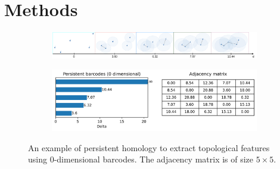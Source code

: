 \vspace{-0.2cm}
\section{Methods}
\label{sec:methods}
\vspace{-0.1cm}

\begin{figure}[H]%
	\centering
	\begin{subfigure}[t]{1\textwidth}
		\centering
		\includegraphics[width=1\textwidth, trim={0cm, 0.0cm, 0.0cm, 0.0cm}]{figures/barcodes_generation_border.png}\hfill
	\end{subfigure}
	\hfill
	\begin{subfigure}[t]{1\textwidth}
		\centering
		\includegraphics[width=1\textwidth, trim={0cm, 0.0cm, 0.0cm, 0.0cm}]{figures/barcode_matrix_title.png}\hfill
	\end{subfigure}
	\hfill
	\caption{An example of persistent homology to extract topological features using 0-dimensional barcodes. The adjacency matrix is of size $5 \times 5$.}
	\label{fig:rips_new}
\end{figure}
